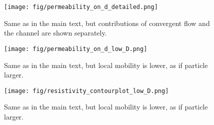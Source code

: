 \documentclass[12pt, a4paper]{article}
\begin{document}
\begin{figure}
    \centering
    \texttt{[image: fig/permeability\_on\_d\_detailed.png]}
    \caption{
        Same as in the main text, but contributions of convergent flow and the channel are shown separately.
        }
    \label{fig:permeability_on_d_detailed}
\end{figure}

\begin{figure}
    \centering
    \texttt{[image: fig/permeability\_on\_d\_low\_D.png]}
    \caption{
        Same as in the main text, but local mobility is lower, as if particle larger.
        }
    \label{fig:permeability_ond_low_D}
\end{figure}

\begin{figure}
    \centering
    \texttt{[image: fig/resistivity\_contourplot\_low\_D.png]}
    \caption{
        Same as in the main text, but local mobility is lower, as if particle larger. 
        }
    \label{fig:resistivity_contourplot_low_d}
\end{figure}
\end{document}
